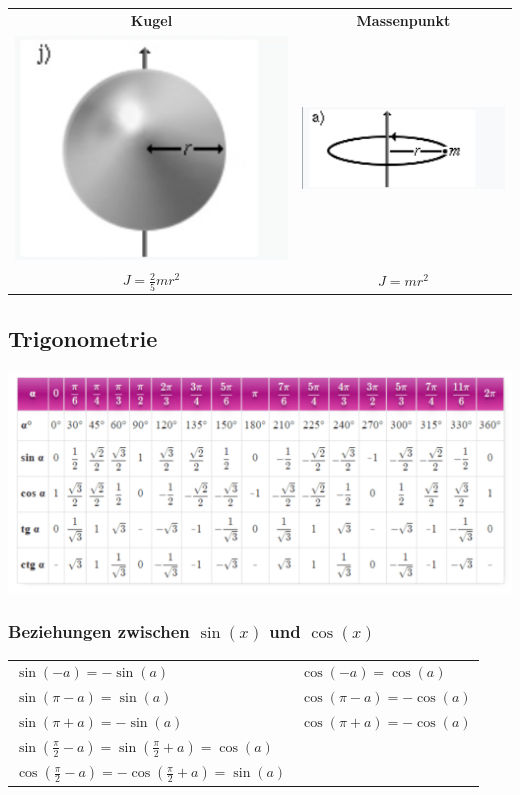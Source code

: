 \begin{center}
\begin{tabular}{| c | c |}
\hline
\textbf{Kugel} & \textbf{Massenpunkt} \\
\includegraphics[width=0.35\linewidth]{Bilder/Wellen-Optik/J_kugel} & \includegraphics[width=0.35\linewidth]{Bilder/Wellen-Optik/J_massepunkt} \\
$J = \frac{2}{5} m r^2$ & $J = m r^2$ \\
\hline
\end{tabular}
\end{center}



\subsection{Trigonometrie}
		
		
		\includegraphics[width=\linewidth]{Bilder/Wellen-Optik/trigo} 
		
		\subsubsection{Beziehungen zwischen $\sin(x)$ und $\cos(x)$}
		\begin{tabular}{ll}
		$\sin(-a) = -\sin(a)$ & $\cos(-a) = \cos(a)$ \\
		$\sin(\pi - a) = \sin(a)$ & $\cos(\pi -a) = - \cos(a)$ \\		
		$\sin(\pi + a) = -\sin(a)$ & $\cos(\pi + a) = - \cos(a)$ \\	
		$\sin(\frac{\pi}{2} - a) = \sin(\frac{\pi}{2} + a) = \cos(a)$ \\
		$\cos(\frac{\pi}{2} - a) = - \cos(\frac{\pi}{2} + a) = \sin(a)$\\		 
		\end{tabular}
		

